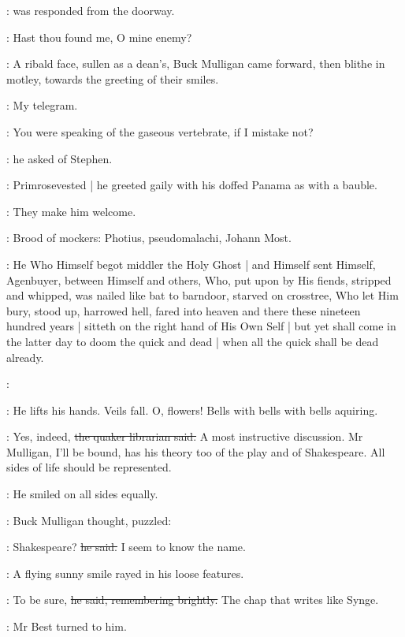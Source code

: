:
was responded from the doorway.

\StephenInt:
Hast thou found me,
O mine enemy?


:
A ribald face,
sullen as a dean's,
Buck Mulligan came forward,
then blithe in motley,
towards the greeting of their smiles.

\StephenInt:
My telegram.

\mulligan:
You were speaking of the gaseous vertebrate,
if I mistake not?

:
he asked of Stephen.

:
Primrosevested |
he greeted gaily with his doffed Panama as with a bauble.%

\StephenInt:
They make him welcome.

\StephenInt:
Brood of mockers:
Photius,
pseudomalachi,
Johann Most.

\StephenInt:
He Who Himself begot middler the Holy Ghost |
and Himself sent Himself,
Agenbuyer,
between Himself and others,
Who,
put upon by His fiends,
stripped and whipped,
was nailed like bat to barndoor,
starved on crosstree,
Who let Him bury,
stood up,
harrowed hell,
fared into heaven and there these nineteen hundred years |
sitteth on the right hand of His Own Self |
but yet shall come in the latter day to doom the quick and dead |
when all the quick shall be dead already.

\StephenInt:

\StephenInt:
He lifts his hands.
Veils fall.
O, flowers!
Bells with bells with bells aquiring.

\librarian:
Yes, indeed,
\sout{the quaker librarian said.}
A most instructive discussion.
Mr Mulligan,
I'll be bound,
has his theory too of the play and of Shakespeare.
All sides of life should be represented.

:
He smiled on all sides equally.

:
Buck Mulligan thought,
puzzled:

\mulligan:
Shakespeare?
\sout{he said.}
I seem to know the name.

:
A flying sunny smile rayed in his loose features.

\mulligan:
To be sure,
\sout{he said, remembering brightly.}
The chap that writes like Synge.

:
Mr Best turned to him.

